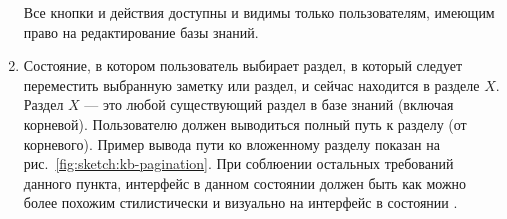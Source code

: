 \begin{enumerate}
            Все кнопки и действия доступны и видимы только пользователям, имеющим право на редактирование
            базы знаний.

        \item \label{itm:req:ui:states:move-kbo}

            Состояние, в котором пользователь выбирает раздел, в который следует переместить
            выбранную заметку или раздел, и сейчас находится в разделе \(X\).
            Раздел \(X\) --- это любой существующий раздел в базе знаний (включая корневой).
            Пользователю должен выводиться полный путь к разделу (от корневого). Пример
            вывода пути ко вложенному разделу показан на рис.~\ref{fig:sketch:kb-pagination}.
            При соблюении остальных требований данного пункта, интерфейс в данном состоянии
            должен быть как можно более похожим стилистически и визуально на интерфейс
            в состоянии
            \hyperref[itm:req:ui:states:navx]
            {}.


\end{enumerate}

